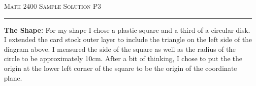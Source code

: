 \documentclass[12pt]{amsart}
\begin{document}
{\scshape Math 2400} \hfill {\scshape \large Sample Solution} \hfill {\scshape P3}
 

 
\smallskip

\hrule


\bigskip

{\bf The Shape:}  For my shape I chose a plastic square and a third of a circular disk.  I extended the card stock outer layer to include the triangle on the left side of the diagram above.  I measured the side of the square as well as the radius of the circle to be approximately 10cm.  After a bit of thinking, I chose to put the the origin at the lower left corner of the square to be the origin of the coordinate plane.

\bigskip
\end{document}
